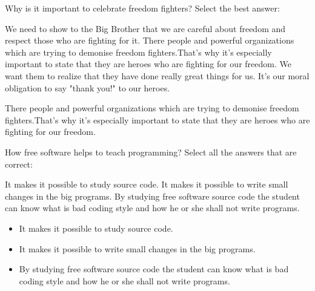 \begin{question}[type=exam]
Why is it important to celebrate freedom fighters? Select the best answer:
\begin{itemize}
\chk We need to show to the Big Brother that we are careful about freedom and respect those who are fighting for it.
\chk There people and powerful organizations which are trying to demonise freedom fighters.That's why it's especially important to state that they are heroes who are fighting for our freedom.
\chk We want them to realize that they have done really great things for us. It's our moral obligation to say "thank you!" to our heroes.
\end{itemize}
\end{question}
\begin{solution}
There people and powerful organizations which are trying to demonise freedom fighters.That's why it's especially important to state that they are heroes who are fighting for our freedom.
\end{solution}


\begin{question}[type=exam]
How free software helps to teach programming? Select all the answers that are correct:
\begin{itemize}
\chk It makes it possible to study source code.
\chk It makes it possible to write small changes in the big programs.
\chk By studying free software source code the student can know what is bad coding style and how he or she shall not write programs.
\end{itemize}
\end{question}
\begin{solution}
\begin{itemize}
\item It makes it possible to study source code.
\item It makes it possible to write small changes in the big programs.
\item By studying free software source code the student can know what is bad coding style and how he or she shall not write programs.
\end{itemize}
\end{solution}


